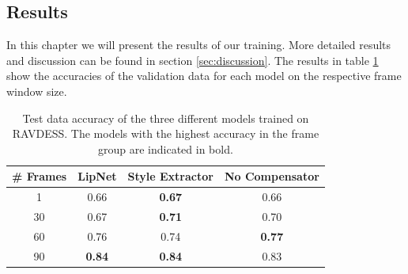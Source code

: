 \subsection{Results}
\label{sec:model_results}
In this chapter we will present the results of our training. More detailed results and discussion can be found in section \ref{sec:discussion}. The results in table \ref{tab:restab} show the accuracies of the validation data for each model on the respective frame window size. 
\begin{table}[h!]
    \centering
    \begin{tabular}{cccc}
    \hline
   \textbf{\# Frames}  & \textbf{LipNet}  & \textbf{Style Extractor}  & \textbf{No Compensator}  \\ \hline
    1 & 0.66 & \textbf{0.67}  & 0.66 \\ 
    30 & 0.67 & \textbf{0.71} & 0.70 \\ 
    60 & 0.76 & 0.74 & \textbf{0.77} \\ 
    90 & \textbf{0.84} & \textbf{0.84} & 0.83 \\ 
\end{tabular}
    \caption{Test data accuracy of the three different models trained on RAVDESS. The models with the highest accuracy in the frame group are indicated in bold.}
    \label{tab:restab}
\end{table}


